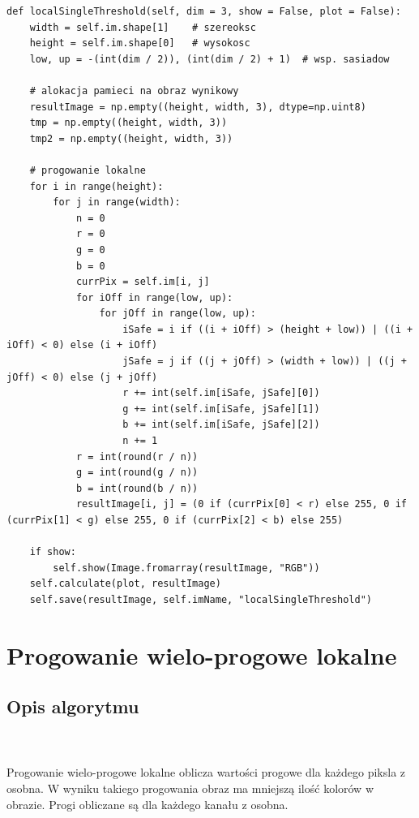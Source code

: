 \documentclass[final,a4paper,openany,12pt]{mwbk}
\begin{document}

\begin{lstlisting}[caption=Progowanie 1-progowe lokalne]
def localSingleThreshold(self, dim = 3, show = False, plot = False):
	width = self.im.shape[1]    # szereoksc
	height = self.im.shape[0]   # wysokosc
	low, up = -(int(dim / 2)), (int(dim / 2) + 1)  # wsp. sasiadow
	
	# alokacja pamieci na obraz wynikowy
	resultImage = np.empty((height, width, 3), dtype=np.uint8)
	tmp = np.empty((height, width, 3))
	tmp2 = np.empty((height, width, 3))
	
	# progowanie lokalne
	for i in range(height):
		for j in range(width):
			n = 0
			r = 0
			g = 0
			b = 0
			currPix = self.im[i, j]
			for iOff in range(low, up):
				for jOff in range(low, up):
					iSafe = i if ((i + iOff) > (height + low)) | ((i + iOff) < 0) else (i + iOff)
					jSafe = j if ((j + jOff) > (width + low)) | ((j + jOff) < 0) else (j + jOff)
					r += int(self.im[iSafe, jSafe][0])
					g += int(self.im[iSafe, jSafe][1])
					b += int(self.im[iSafe, jSafe][2])
					n += 1
			r = int(round(r / n))
			g = int(round(g / n))
			b = int(round(b / n))
			resultImage[i, j] = (0 if (currPix[0] < r) else 255, 0 if (currPix[1] < g) else 255, 0 if (currPix[2] < b) else 255)
	
	if show:
		self.show(Image.fromarray(resultImage, "RGB"))
	self.calculate(plot, resultImage)
	self.save(resultImage, self.imName, "localSingleThreshold")
\end{lstlisting}

\newpage




\section{Progowanie wielo-progowe lokalne}
\subsection*{Opis algorytmu}
\hfill
\\\\
\indent Progowanie wielo-progowe lokalne oblicza wartości progowe dla każdego piksla z osobna. W wyniku takiego progowania obraz ma mniejszą ilość kolorów w obrazie. Progi obliczane są dla każdego kanału z osobna.
\end{document}
